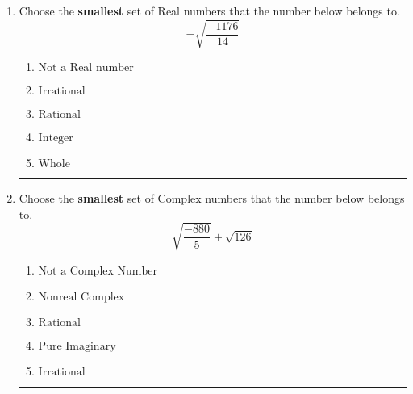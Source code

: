 \documentclass[14pt]{extbook}
\newcommand{\litem}[1]{\item#1\hspace*{-1cm}\rule{\textwidth}{0.4pt}}
\begin{document}
\begin{enumerate}
{\begin{enumerate}[label=\Alph*.]
\end{enumerate} }
\litem{
Choose the \textbf{smallest} set of Real numbers that the number below belongs to.\[ -\sqrt{\frac{-1176}{14}} \]\begin{enumerate}[label=\Alph*.]
\item \( \text{Not a Real number} \)
\item \( \text{Irrational} \)
\item \( \text{Rational} \)
\item \( \text{Integer} \)
\item \( \text{Whole} \)

\end{enumerate} }
\litem{
Choose the \textbf{smallest} set of Complex numbers that the number below belongs to.\[ \sqrt{\frac{-880}{5}}+\sqrt{126} \]\begin{enumerate}[label=\Alph*.]
\item \( \text{Not a Complex Number} \)
\item \( \text{Nonreal Complex} \)
\item \( \text{Rational} \)
\item \( \text{Pure Imaginary} \)
\item \( \text{Irrational} \)

\end{enumerate} }
\end{enumerate}
\end{document}

